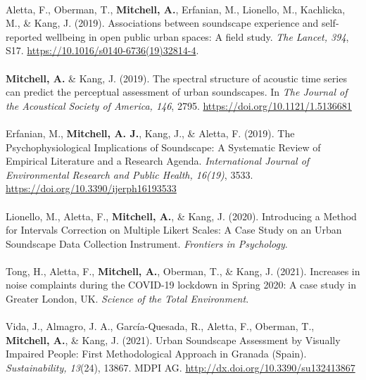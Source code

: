 \documentclass[oneside,fontsize=11pt,titlepage,chapterprefix=true
]{scrbook}
\begin{document}
\paragraph*{}
Aletta, F., Oberman, T., \textbf{Mitchell, A.}, Erfanian, M., Lionello, M., Kachlicka, M., \& Kang, J. (2019). Associations between soundscape experience and self-reported wellbeing in open public urban spaces: A field study. \emph{The Lancet, 394}, S17. \url{https://10.1016/s0140-6736(19)32814-4}.

\paragraph*{}
\textbf{Mitchell, A.} \& Kang, J. (2019). The spectral structure of acoustic time series can predict the perceptual assessment of urban soundscapes. In \emph{The Journal of the Acoustical Society of America, 146}, 2795. \url{https://doi.org/10.1121/1.5136681}

\paragraph*{}
Erfanian, M., \textbf{Mitchell, A. J.}, Kang, J., \& Aletta, F. (2019). The Psychophysiological Implications of Soundscape: A Systematic Review of Empirical Literature and a Research Agenda. \emph{International Journal of Environmental Research and Public Health, 16(19)}, 3533. \url{https://doi.org/10.3390/ijerph16193533}

\paragraph*{}
Lionello, M., Aletta, F., \textbf{Mitchell, A.}, \& Kang, J. (2020). Introducing a Method for Intervals Correction on Multiple Likert Scales: A Case Study on an Urban Soundscape Data Collection Instrument. \emph{Frontiers in Psychology}.

\paragraph*{}Tong, H., Aletta, F., \textbf{Mitchell, A.}, Oberman, T., \& Kang, J. (2021). Increases in noise complaints during the COVID-19 lockdown in Spring 2020: A case study in Greater London, UK. \emph{Science of the Total Environment}.

\paragraph*{}
Vida, J., Almagro, J. A., García-Quesada, R., Aletta, F., Oberman, T., \textbf{Mitchell, A.}, \& Kang, J. (2021). Urban Soundscape Assessment by Visually Impaired People: First Methodological Approach in Granada (Spain). \emph{Sustainability, 13}(24), 13867. MDPI AG. \url{http://dx.doi.org/10.3390/su132413867}
\end{document}
